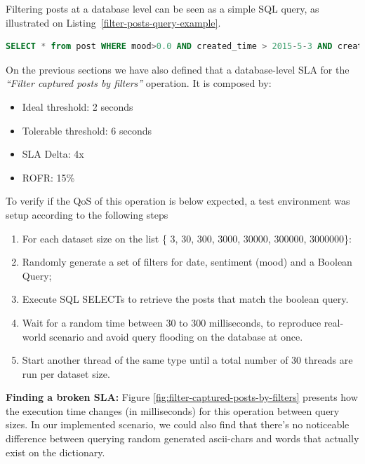 Filtering posts at a database level can be seen as a simple SQL query, as illustrated on Listing~\ref{filter-posts-query-example}.

\begin{lstlisting}[language=SQL,firstnumber=1, caption=Filter posts query - Example, label=filter-posts-query-example]
SELECT * from post WHERE mood>0.0 AND created_time > 2015-5-3 AND created_time < 2015-7-15 AND message like '%ruim%'
\end{lstlisting} 


On the previous sections we have also defined that a database-level SLA for the \textit{``Filter captured posts by filters''} operation. It is composed by: 

\begin{itemize}
	\item{Ideal threshold: 2 seconds}
	\item{Tolerable threshold: 6 seconds}
	\item{SLA Delta: 4x}
	\item{ROFR: 15\%}
\end{itemize}

To verify if the QoS of this operation is below expected, a test environment was setup according to the following steps

\begin{enumerate}
\item{For each dataset size on the list \{ 3, 30, 300, 3000, 30000, 300000, 3000000\}:}
\item{Randomly generate a set of filters for date, sentiment (mood) and a Boolean Query;}
\item{Execute SQL SELECTs to retrieve the posts that match the boolean query.}
\item{Wait for a random time between 30 to 300 milliseconds, to reproduce real-world scenario and avoid	query flooding on the database at once.}
\item{Start another thread of the same type until a total number of 30 threads are run per dataset size.}
\end{enumerate}


\textbf{Finding a broken SLA: }
Figure \ref{fig:filter-captured-posts-by-filters} presents how the execution time changes (in milliseconds) for this operation between query sizes. In our implemented scenario, we could also find that there's no noticeable difference between querying random generated ascii-chars and words that actually exist on the dictionary.

